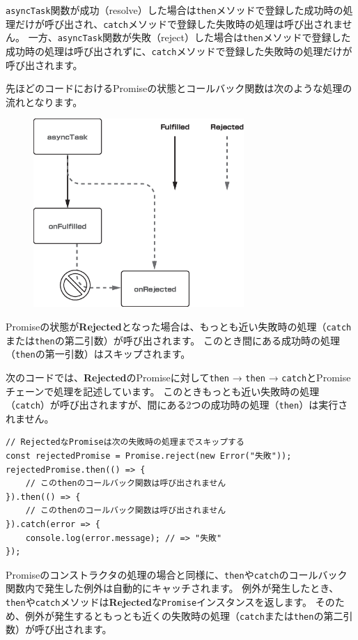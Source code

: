 \texttt{asyncTask}関数が成功（resolve）した場合は\texttt{then}メソッドで登録した成功時の処理だけが呼び出され、\texttt{catch}メソッドで登録した失敗時の処理は呼び出されません。
一方、\texttt{asyncTask}関数が失敗（reject）した場合は\texttt{then}メソッドで登録した成功時の処理は呼び出されずに、\texttt{catch}メソッドで登録した失敗時の処理だけが呼び出されます。

先ほどのコードにおけるPromiseの状態とコールバック関数は次のような処理の流れとなります。

\begin{figure}[h]
\centering
\includegraphics[width=80mm]{fig/promise-chain.eps}
\end{figure}

Promiseの状態が\textbf{Rejected}となった場合は、もっとも近い失敗時の処理（\texttt{catch}または\texttt{then}の第二引数）が呼び出されます。
このとき間にある成功時の処理（\texttt{then}の第一引数）はスキップされます。

次のコードでは、\textbf{Rejected}のPromiseに対して\texttt{then}
→ \texttt{then} →
\texttt{catch}とPromiseチェーンで処理を記述しています。
このときもっとも近い失敗時の処理（\texttt{catch}）が呼び出されますが、間にある2つの成功時の処理（\texttt{then}）は実行されません。

\begin{lstlisting}
// RejectedなPromiseは次の失敗時の処理までスキップする
const rejectedPromise = Promise.reject(new Error("失敗"));
rejectedPromise.then(() => {
    // このthenのコールバック関数は呼び出されません
}).then(() => {
    // このthenのコールバック関数は呼び出されません
}).catch(error => {
    console.log(error.message); // => "失敗"
});
\end{lstlisting}

Promiseのコンストラクタの処理の場合と同様に、\texttt{then}や\texttt{catch}のコールバック関数内で発生した例外は自動的にキャッチされます。
例外が発生したとき、\texttt{then}や\texttt{catch}メソッドは\textbf{Rejected}な\texttt{Promise}インスタンスを返します。
そのため、例外が発生するともっとも近くの失敗時の処理（\texttt{catch}または\texttt{then}の第二引数）が呼び出されます。

